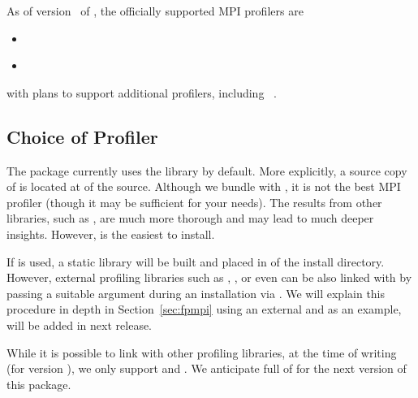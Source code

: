 As of version \profversion\ of , the officially supported MPI profilers are
\begin{itemize}
  \item {}~\citep{fpmpi}
  \item {}~\citep{mpiP}
\end{itemize}
with plans to support additional profilers, including ~\citep{TAU}.




\subsection{Choice of Profiler}

The  package currently uses the  library by default.  
More explicitly, a source copy of  is located at 
 of the  source. Although we bundle  with , it is not the best MPI profiler (though it may be sufficient for your needs).  The results from other libraries, such as , are much more thorough and may lead to much deeper insights.  However,  is the easiest to install. 

If  is used, a
static library will be built and placed in 
of the  install directory.  However, external profiling 
libraries such as , , or even   can be also 
linked with  by passing a suitable  
argument during an installation via . We will explain this 
procedure in depth in Section~\ref{sec:fpmpi} using an external  and 
as an example,  will be added in next release.

While it is possible to link with other profiling libraries, at the time of 
writing (for version \profversion), we only support  and .  We anticipate full 
of  for the next version of this package.